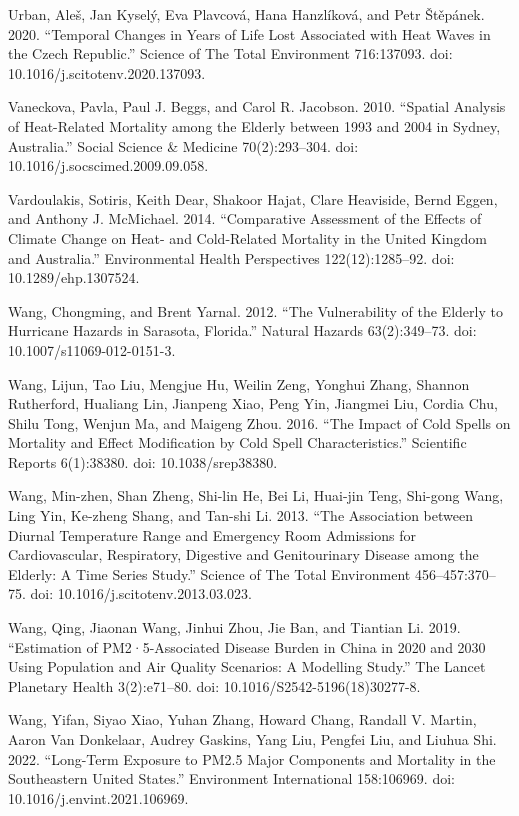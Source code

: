 \documentclass[12pt]{article}
\begin{document}
Urban, Aleš, Jan Kyselý, Eva Plavcová, Hana Hanzlíková, and Petr
Štěpánek. 2020. ``Temporal Changes in Years of Life Lost Associated with
Heat Waves in the Czech Republic.'' Science of The Total Environment
716:137093. doi: 10.1016/j.scitotenv.2020.137093.

Vaneckova, Pavla, Paul J. Beggs, and Carol R. Jacobson. 2010. ``Spatial
Analysis of Heat-Related Mortality among the Elderly between 1993 and
2004 in Sydney, Australia.'' Social Science \& Medicine 70(2):293--304.
doi: 10.1016/j.socscimed.2009.09.058.

Vardoulakis, Sotiris, Keith Dear, Shakoor Hajat, Clare Heaviside, Bernd
Eggen, and Anthony J. McMichael. 2014. ``Comparative Assessment of the
Effects of Climate Change on Heat- and Cold-Related Mortality in the
United Kingdom and Australia.'' Environmental Health Perspectives
122(12):1285--92. doi: 10.1289/ehp.1307524.

Wang, Chongming, and Brent Yarnal. 2012. ``The Vulnerability of the
Elderly to Hurricane Hazards in Sarasota, Florida.'' Natural Hazards
63(2):349--73. doi: 10.1007/s11069-012-0151-3.

Wang, Lijun, Tao Liu, Mengjue Hu, Weilin Zeng, Yonghui Zhang, Shannon
Rutherford, Hualiang Lin, Jianpeng Xiao, Peng Yin, Jiangmei Liu, Cordia
Chu, Shilu Tong, Wenjun Ma, and Maigeng Zhou. 2016. ``The Impact of Cold
Spells on Mortality and Effect Modification by Cold Spell
Characteristics.'' Scientific Reports 6(1):38380. doi:
10.1038/srep38380.

Wang, Min-zhen, Shan Zheng, Shi-lin He, Bei Li, Huai-jin Teng, Shi-gong
Wang, Ling Yin, Ke-zheng Shang, and Tan-shi Li. 2013. ``The Association
between Diurnal Temperature Range and Emergency Room Admissions for
Cardiovascular, Respiratory, Digestive and Genitourinary Disease among
the Elderly: A Time Series Study.'' Science of The Total Environment
456--457:370--75. doi: 10.1016/j.scitotenv.2013.03.023.

Wang, Qing, Jiaonan Wang, Jinhui Zhou, Jie Ban, and Tiantian Li. 2019.
``Estimation of PM2·5-Associated Disease Burden in China in 2020 and
2030 Using Population and Air Quality Scenarios: A Modelling Study.''
The Lancet Planetary Health 3(2):e71--80. doi:
10.1016/S2542-5196(18)30277-8.

Wang, Yifan, Siyao Xiao, Yuhan Zhang, Howard Chang, Randall V. Martin,
Aaron Van Donkelaar, Audrey Gaskins, Yang Liu, Pengfei Liu, and Liuhua
Shi. 2022. ``Long-Term Exposure to PM2.5 Major Components and Mortality
in the Southeastern United States.'' Environment International
158:106969. doi: 10.1016/j.envint.2021.106969.
\end{document}
